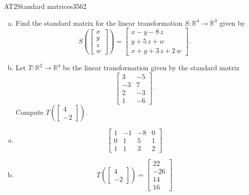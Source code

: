 \begin{exercise}{AT2}{Standard matrices}{3562} 
\begin{exerciseStatement} 

\begin{enumerate}[(a)]
\item Find the standard matrix for the linear transformation \(S:\mathbb{R}^4 \to \mathbb{R}^3\) given by \[S\left( \left[\begin{array}{c}
x \\
y \\
z \\
{w}
\end{array}\right] \right) = \left[\begin{array}{c}
x - y - 8 \, z \\
y + 5 \, z + {w} \\
x + y + 3 \, z + 2 \, {w}
\end{array}\right].\] 
\item Let \(T:\mathbb{R}^2 \to \mathbb{R}^4\) be the linear transformation given by the standard matrix \[\left[\begin{array}{cc}
3 & -5 \\
-3 & 7 \\
2 & -3 \\
1 & -6
\end{array}\right].\] Compute \(T\left(\left[\begin{array}{c}
4 \\
-2
\end{array}\right]\right)\). 
\end{enumerate}

     \end{exerciseStatement}
 \begin{exerciseAnswer} 

\begin{enumerate}[(a)]
\item  \[\left[\begin{array}{cccc}
1 & -1 & -8 & 0 \\
0 & 1 & 5 & 1 \\
1 & 1 & 3 & 2
\end{array}\right]\] 
\item  \[T\left(\left[\begin{array}{c}
4 \\
-2
\end{array}\right]\right)=\left[\begin{array}{c}
22 \\
-26 \\
14 \\
16
\end{array}\right]\] 
\end{enumerate}

     \end{exerciseAnswer}
 \end{exercise}


